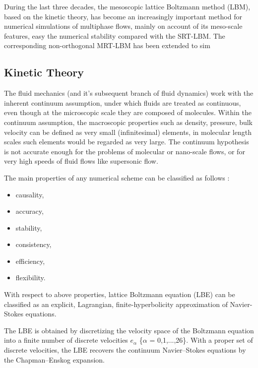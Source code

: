 During the last three decades, the mesoscopic lattice Boltzmann method (LBM), based on the kinetic theory, has become an increasingly important method for numerical simulations of multiphase flows, mainly on account of its meso-scale features, easy the numerical stability compared with the SRT-LBM. The corresponding non-orthogonal MRT-LBM has been extended to sim 


\subsection{Kinetic Theory}

The fluid mechanics (and it's subsequent branch of fluid dynamics) work with the inherent continuum assumption, under which fluids are treated as continuous, even though at the microscopic scale they are composed of molecules. Within the continuum assumption, the macroscopic properties such as density, pressure, bulk velocity can be defined as very small (infinitesimal) elements, in molecular length scales such elements would be regarded as very large. The continuum hypothesis is not accurate enough for the problems of molecular or nano-scale flows, or for very high speeds of fluid flows like supersonic flow.

The main properties of any numerical scheme can be classified as follows \citep{succi2001lattice}:

\begin{itemize}
	\item causality,
	\item accuracy,
	\item stability,
	\item consistency,
	\item efficiency,
	\item flexibility. 
\end{itemize}

With respect to above properties, lattice Boltzmann equation (LBE) can be classified as an explicit, Lagrangian, finite-hyperbolicity approximation of Navier-Stokes equations. 


The LBE is obtained by discretizing the velocity space of the Boltzmann equation into a finite number of discrete velocities $e_\alpha$ \{$\alpha$ = 0,1,...,26\}. With a proper set of discrete velocities, the LBE recovers the continuum Navier–Stokes equations by the Chapman–Enskog expansion.


